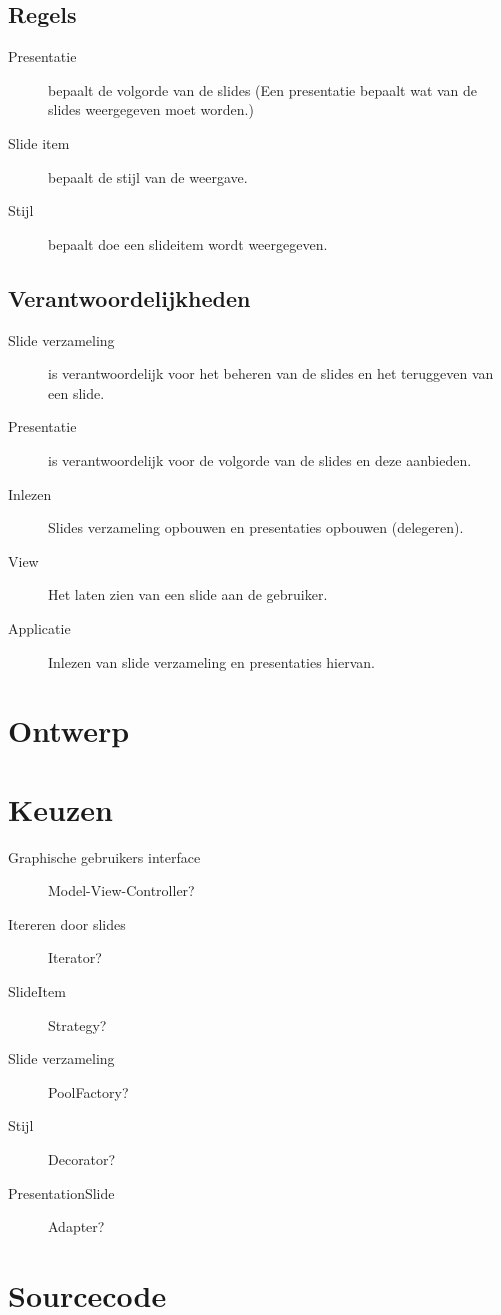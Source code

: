 \documentclass[a4paper]{article}
\begin{document}
\subsection{Regels}
\begin{description}
\item[Presentatie] bepaalt de volgorde van de slides
(Een presentatie bepaalt wat van de slides weergegeven moet worden.)
\item[Slide item] bepaalt de stijl van de weergave.
\item[Stijl] bepaalt doe een slideitem wordt weergegeven. 
\end{description}

\subsection{Verantwoordelijkheden}
\begin{description}
\item[Slide verzameling] is verantwoordelijk voor het beheren van de slides en het teruggeven van een slide.
\item[Presentatie] is verantwoordelijk voor de volgorde van de slides en deze aanbieden.
\item[Inlezen] Slides verzameling opbouwen en presentaties opbouwen (delegeren).
\item[View] Het laten zien van een slide aan de gebruiker.
\item[Applicatie] Inlezen van slide verzameling en presentaties hiervan.
\end{description}


\section{Ontwerp}


\section{Keuzen}
\begin{description}
\item[Graphische gebruikers interface] Model-View-Controller?
\item[Itereren door slides] Iterator?
\item[SlideItem] Strategy?
\item[Slide verzameling] PoolFactory?
\item[Stijl] Decorator?
\item[PresentationSlide] Adapter?
\end{description}

\section{Sourcecode}
\end{document}
